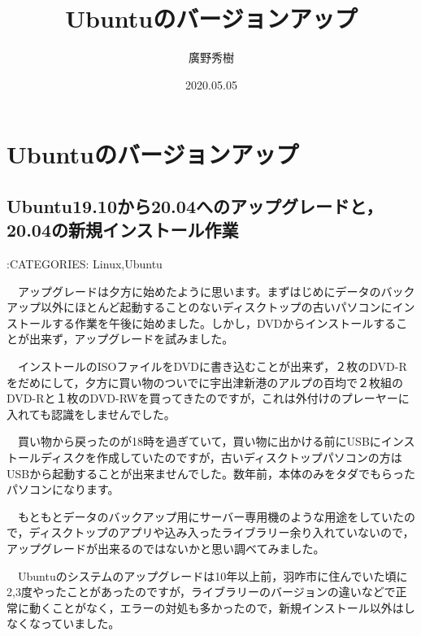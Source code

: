 \documentclass[]{ltjarticle}
\begin{document}
\tableofcontents \newpage

\title{Ubuntuのバージョンアップ}
\author{廣野秀樹}
\date{2020.05.05}
\maketitle




\hypertarget{ubuntuux306eux30d0ux30fcux30b8ux30e7ux30f3ux30a2ux30c3ux30d7}{%
\section{Ubuntuのバージョンアップ}\label{ubuntuux306eux30d0ux30fcux30b8ux30e7ux30f3ux30a2ux30c3ux30d7}}

\hypertarget{ubuntu19.10ux304bux308920.04ux3078ux306eux30a2ux30c3ux30d7ux30b0ux30ecux30fcux30c9ux306820.04ux306eux65b0ux898fux30a4ux30f3ux30b9ux30c8ux30fcux30ebux4f5cux696d}{%
\subsection{Ubuntu19.10から20.04へのアップグレードと，20.04の新規インストール作業}\label{ubuntu19.10ux304bux308920.04ux3078ux306eux30a2ux30c3ux30d7ux30b0ux30ecux30fcux30c9ux306820.04ux306eux65b0ux898fux30a4ux30f3ux30b9ux30c8ux30fcux30ebux4f5cux696d}}

:CATEGORIES: Linux,Ubuntu

　アップグレードは夕方に始めたように思います。まずはじめにデータのバックアップ以外にほとんど起動することのないディスクトップの古いパソコンにインストールする作業を午後に始めました。しかし，DVDからインストールすることが出来ず，アップグレードを試みました。

　インストールのISOファイルをDVDに書き込むことが出来ず，２枚のDVD-Rをだめにして，夕方に買い物のついでに宇出津新港のアルプの百均で２枚組のDVD-Rと１枚のDVD-RWを買ってきたのですが，これは外付けのプレーヤーに入れても認識をしませんでした。

　買い物から戻ったのが18時を過ぎていて，買い物に出かける前にUSBにインストールディスクを作成していたのですが，古いディスクトップパソコンの方はUSBから起動することが出来ませんでした。数年前，本体のみをタダでもらったパソコンになります。

　もともとデータのバックアップ用にサーバー専用機のような用途をしていたので，ディスクトップのアプリや込み入ったライブラリー余り入れていないので，アップグレードが出来るのではないかと思い調べてみました。

　Ubuntuのシステムのアップグレードは10年以上前，羽咋市に住んでいた頃に2,3度やったことがあったのですが，ライブラリーのバージョンの違いなどで正常に動くことがなく，エラーの対処も多かったので，新規インストール以外はしなくなっていました。
\end{document}
